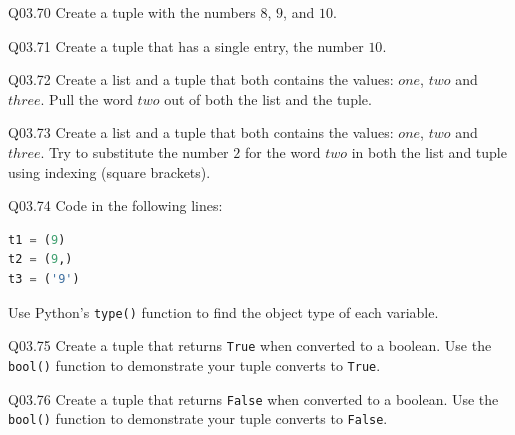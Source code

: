 \documentclass{book}
\begin{document}
Q03.70 Create a tuple with the numbers \(8\), \(9\), and \(10\).

Q03.71 Create a tuple that has a single entry, the number \(10\).

Q03.72 Create a list and a tuple that both contains the values: \(one\),
\(two\) and \(three\). Pull the word \(two\) out of both the list and
the tuple.

Q03.73 Create a list and a tuple that both contains the values: \(one\),
\(two\) and \(three\). Try to substitute the number \(2\) for the word
\(two\) in both the list and tuple using indexing (square brackets).

Q03.74 Code in the following lines:

\begin{lstlisting}[language=Python]
t1 = (9)
t2 = (9,)
t3 = ('9')
\end{lstlisting}

Use Python's \lstinline!type()! function to find the object type of each
variable.

Q03.75 Create a tuple that returns \lstinline!True! when converted to a
boolean. Use the \lstinline!bool()! function to demonstrate your tuple
converts to \lstinline!True!.

Q03.76 Create a tuple that returns \lstinline!False! when converted to a
boolean. Use the \lstinline!bool()! function to demonstrate your tuple
converts to \lstinline!False!.
    
\end{document}

